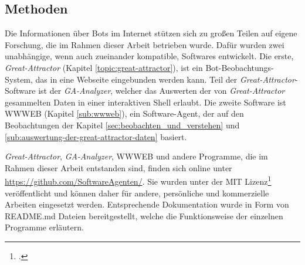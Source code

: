 \subsection{Methoden}
\label{sub:forschung_methoden}

Die Informationen über Bots im Internet stützen sich zu großen Teilen auf
eigene Forschung, die im Rahmen dieser Arbeit betrieben wurde. Dafür wurden
zwei unabhängige, wenn auch zueinander kompatible, Softwares entwickelt. Die
erste, \emph{Great-Attractor} (Kapitel \ref{topic:great-attractor}), ist ein
Bot-Beobachtungs-System, das in eine Webseite eingebunden werden kann. Teil der
\emph{Great-Attractor}-Software ist der \emph{GA-Analyzer}, welcher das
Auswerten der von \emph{Great-Attractor} gesammelten Daten in einer
interaktiven Shell erlaubt. Die zweite Software ist WWWEB (Kapitel
\ref{sub:wwweb}), ein Software-Agent, der auf den Beobachtungen der Kapitel
\ref{sec:beobachten_und_verstehen} und
\ref{sub:auswertung-der-great-attractor-daten} basiert.

\emph{Great-Attractor}, \emph{GA-Analyzer}, WWWEB und andere Programme, die im
Rahmen dieser Arbeit entstanden sind, finden sich online unter
\url{https://github.com/SoftwareAgenten/}. Sie wurden unter der MIT
Lizenz\footcite{license:MIT} veröffentlicht und können daher für andere,
persönliche und kommerzielle Arbeiten eingesetzt werden. Entsprechende
Dokumentation wurde in Form von README.md Dateien bereitgestellt, welche die
Funktionsweise der einzelnen Programme erläutern.
